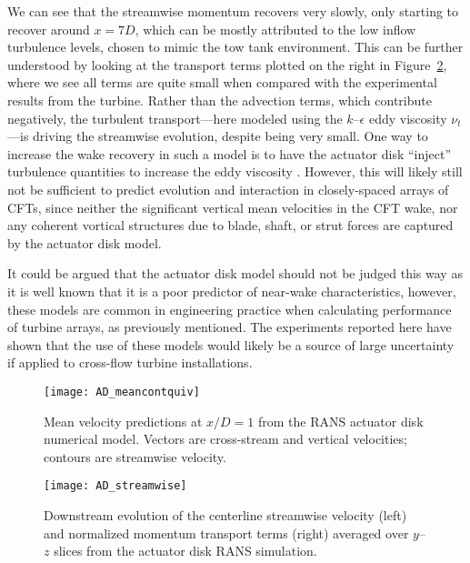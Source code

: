 We can see that the streamwise momentum recovers very slowly, only starting to
recover around $x=7D$, which can be mostly attributed to the low inflow
turbulence levels, chosen to mimic the tow tank environment. This can be further
understood by looking at the transport terms plotted on the right in
Figure~\ref{fig:AD-streamwise}, where we see all terms are quite small when
compared with the experimental results from the turbine. Rather than the
advection terms, which contribute negatively, the turbulent transport---here
modeled using the $k$--$\epsilon$ eddy viscosity $\nu_t$---is driving the
streamwise evolution, despite being very small. One way to increase the wake
recovery in such a model is to have the actuator disk ``inject'' turbulence
quantities to increase the eddy viscosity \cite{James2011, Nelson2013}. However,
this will likely still not be sufficient to predict evolution and interaction in
closely-spaced arrays of CFTs, since neither the significant vertical mean 
velocities in the CFT wake, nor any coherent vortical structures 
due to blade, shaft, or strut forces are captured by the actuator disk model.

It could be argued that the actuator disk model should not be judged this way as
it is well known that it is a poor predictor of near-wake characteristics,
however, these models are common in engineering practice when calculating
performance of turbine arrays, as previously mentioned. The experiments reported
here have shown that the use of these models would likely be a source of large
uncertainty if applied to cross-flow turbine installations.

\begin{figure}
    \centering
    
    \texttt{[image: AD\_meancontquiv]}

    \caption{Mean velocity predictions at $x/D=1$ from the RANS actuator disk
        numerical model. Vectors are cross-stream and vertical velocities; contours
        are streamwise velocity.}
    
    \label{fig:AD-contours}
\end{figure}

\begin{figure}
    \centering 
    
    \texttt{[image: AD\_streamwise]}
    
    \caption{Downstream evolution of the centerline streamwise velocity (left)
        and normalized momentum transport terms (right) averaged over $y$--$z$
        slices from the actuator disk RANS simulation.} 
    
    \label{fig:AD-streamwise}
\end{figure}

